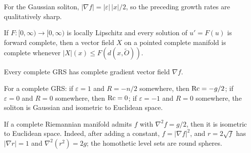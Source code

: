 \begin{remark}
\label{rem:chow-iv-gradient-potential-sharp}


For the Gaussian soliton, $|\nabla f|=|\varepsilon|\,|x|/2$, so the preceding
growth rates are qualitatively sharp.
\end{remark}

\begin{lemma}
\label{lem:chow-iv-vector-field-completeness}

If $F:[0,\infty)\to[0,\infty)$ is locally Lipschitz and every solution of
$u'=F(u)$ is forward complete, then a vector field $X$ on a pointed complete
manifold is complete whenever $|X|(x)\le F(d(x,\widetilde O))$.
\end{lemma}

\begin{corollary}
\label{cor:chow-iv-gradient-complete}


Every complete GRS has complete gradient vector field $\nabla f$.
\end{corollary}

\begin{proposition}
\label{prop:chow-iv-scalar-lower-equality}


For a complete GRS: if $\varepsilon=1$ and $R=-n/2$ somewhere, then
$\operatorname{Rc}=-g/2$; if $\varepsilon=0$ and $R=0$ somewhere, then $\operatorname{Rc}=0$; if
$\varepsilon=-1$ and $R=0$ somewhere, the soliton is Gaussian and isometric to
Euclidean space.
\end{proposition}

\begin{lemma}
\label{lem:chow-iv-hessian-characterizes-euclidean}


If a complete Riemannian manifold admits $f$ with $\nabla^2f=g/2$, then it is
isometric to Euclidean space.  Indeed, after adding a constant,
$f=|\nabla f|^2$, and $r=2\sqrt f$ has $|\nabla r|=1$ and
$\nabla^2(r^2)=2g$; the homothetic level sets are round spheres.
\end{lemma}

